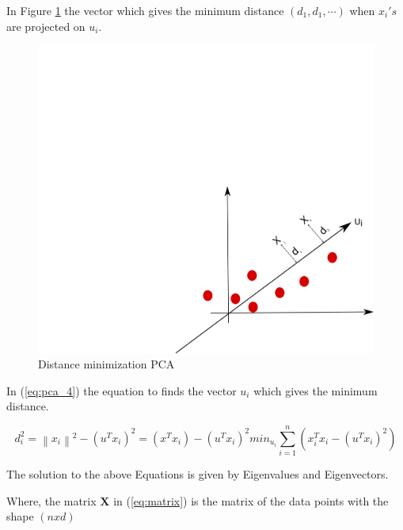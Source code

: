 In Figure \ref{fig:pca_step3} the vector which gives the minimum distance $(d_1,d_1, \cdots)$ when $x_i's$ are projected on $u_i$. 

\begin{figure}[H]
\centering
\includegraphics[scale=0.7]{imagens/pca3.png}
\caption{Distance minimization PCA}
\label{fig:pca_step3}
\end{figure}

In (\ref{eq:pca_4}) the equation to finds the vector $u_i$ which gives the minimum distance. 

\begin{subequations}
    \label{eq:pca_4}
    \begin{equation}
        d_i^2 = \left \| x_i \right \|^2 - \left ( u^Tx_i \right )^2
    \end{equation}
    \begin{equation}
        = \left ( x^Tx_i \right ) - (u^Tx_i)^2
    \end{equation}
    \begin{equation}
        min_{u_i} \sum_{i=1}^{n}\left ( x_i^Tx_i - \left ( u^Tx_i \right )^2 \right )
    \end{equation}
\end{subequations}

The solution to the above Equations is given by Eigenvalues and Eigenvectors. 

Where, the matrix $\mathbf{X}$ in (\ref{eq:matrix}) is the matrix of the data points with the shape $(n x d)$

